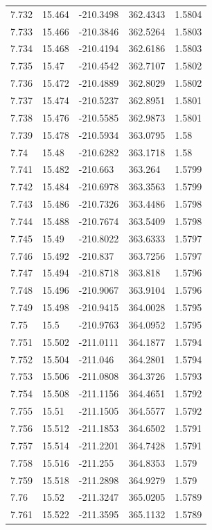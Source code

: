 \begin{tabular}{lllll}
7.732 & 15.464 & -210.3498 & 362.4343 & 1.5804 \\
7.733 & 15.466 & -210.3846 & 362.5264 & 1.5803 \\
7.734 & 15.468 & -210.4194 & 362.6186 & 1.5803 \\
7.735 & 15.47 & -210.4542 & 362.7107 & 1.5802 \\
7.736 & 15.472 & -210.4889 & 362.8029 & 1.5802 \\
7.737 & 15.474 & -210.5237 & 362.8951 & 1.5801 \\
7.738 & 15.476 & -210.5585 & 362.9873 & 1.5801 \\
7.739 & 15.478 & -210.5934 & 363.0795 & 1.58 \\
7.74 & 15.48 & -210.6282 & 363.1718 & 1.58 \\
7.741 & 15.482 & -210.663 & 363.264 & 1.5799 \\
7.742 & 15.484 & -210.6978 & 363.3563 & 1.5799 \\
7.743 & 15.486 & -210.7326 & 363.4486 & 1.5798 \\
7.744 & 15.488 & -210.7674 & 363.5409 & 1.5798 \\
7.745 & 15.49 & -210.8022 & 363.6333 & 1.5797 \\
7.746 & 15.492 & -210.837 & 363.7256 & 1.5797 \\
7.747 & 15.494 & -210.8718 & 363.818 & 1.5796 \\
7.748 & 15.496 & -210.9067 & 363.9104 & 1.5796 \\
7.749 & 15.498 & -210.9415 & 364.0028 & 1.5795 \\
7.75 & 15.5 & -210.9763 & 364.0952 & 1.5795 \\
7.751 & 15.502 & -211.0111 & 364.1877 & 1.5794 \\
7.752 & 15.504 & -211.046 & 364.2801 & 1.5794 \\
7.753 & 15.506 & -211.0808 & 364.3726 & 1.5793 \\
7.754 & 15.508 & -211.1156 & 364.4651 & 1.5792 \\
7.755 & 15.51 & -211.1505 & 364.5577 & 1.5792 \\
7.756 & 15.512 & -211.1853 & 364.6502 & 1.5791 \\
7.757 & 15.514 & -211.2201 & 364.7428 & 1.5791 \\
7.758 & 15.516 & -211.255 & 364.8353 & 1.579 \\
7.759 & 15.518 & -211.2898 & 364.9279 & 1.579 \\
7.76 & 15.52 & -211.3247 & 365.0205 & 1.5789 \\
7.761 & 15.522 & -211.3595 & 365.1132 & 1.5789 \\

\end{tabular}

